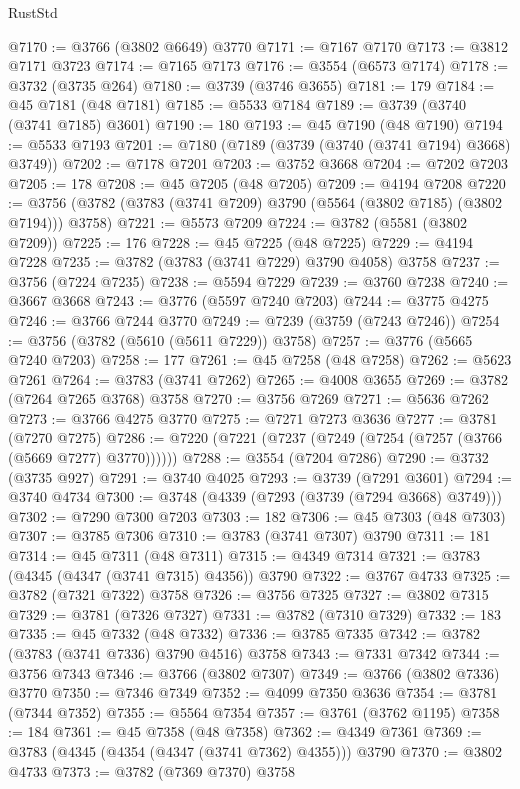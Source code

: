 \begin{lexlean}{RustStd}
\begin{coremodule}
@7170 := @3766 (@3802 @6649) @3770
@7171 := @7167 @7170
@7173 := @3812 @7171 @3723
@7174 := @7165 @7173
@7176 := @3554 (@6573 @7174)
@7178 := @3732 (@3735 @264)
@7180 := @3739 (@3746 @3655)
@7181 := 179
@7184 := @45 @7181 (@48 @7181)
@7185 := @5533 @7184
@7189 := @3739 (@3740 (@3741 @7185) @3601)
@7190 := 180
@7193 := @45 @7190 (@48 @7190)
@7194 := @5533 @7193
@7201 := @7180 (@7189 (@3739 (@3740 (@3741 @7194) @3668) @3749))
@7202 := @7178 @7201
@7203 := @3752 @3668
@7204 := @7202 @7203
@7205 := 178
@7208 := @45 @7205 (@48 @7205)
@7209 := @4194 @7208
@7220 := @3756 (@3782 (@3783 (@3741 @7209) @3790 (@5564 (@3802 @7185) (@3802 @7194))) @3758)
@7221 := @5573 @7209
@7224 := @3782 (@5581 (@3802 @7209))
@7225 := 176
@7228 := @45 @7225 (@48 @7225)
@7229 := @4194 @7228
@7235 := @3782 (@3783 (@3741 @7229) @3790 @4058) @3758
@7237 := @3756 (@7224 @7235)
@7238 := @5594 @7229
@7239 := @3760 @7238
@7240 := @3667 @3668
@7243 := @3776 (@5597 @7240 @7203)
@7244 := @3775 @4275
@7246 := @3766 @7244 @3770
@7249 := @7239 (@3759 (@7243 @7246))
@7254 := @3756 (@3782 (@5610 (@5611 @7229)) @3758)
@7257 := @3776 (@5665 @7240 @7203)
@7258 := 177
@7261 := @45 @7258 (@48 @7258)
@7262 := @5623 @7261
@7264 := @3783 (@3741 @7262)
@7265 := @4008 @3655
@7269 := @3782 (@7264 @7265 @3768) @3758
@7270 := @3756 @7269
@7271 := @5636 @7262
@7273 := @3766 @4275 @3770
@7275 := @7271 @7273 @3636
@7277 := @3781 (@7270 @7275)
@7286 := @7220 (@7221 (@7237 (@7249 (@7254 (@7257 (@3766 (@5669 @7277) @3770))))))
@7288 := @3554 (@7204 @7286)
@7290 := @3732 (@3735 @927)
@7291 := @3740 @4025
@7293 := @3739 (@7291 @3601)
@7294 := @3740 @4734
@7300 := @3748 (@4339 (@7293 (@3739 (@7294 @3668) @3749)))
@7302 := @7290 @7300 @7203
@7303 := 182
@7306 := @45 @7303 (@48 @7303)
@7307 := @3785 @7306
@7310 := @3783 (@3741 @7307) @3790
@7311 := 181
@7314 := @45 @7311 (@48 @7311)
@7315 := @4349 @7314
@7321 := @3783 (@4345 (@4347 (@3741 @7315) @4356)) @3790
@7322 := @3767 @4733
@7325 := @3782 (@7321 @7322) @3758
@7326 := @3756 @7325
@7327 := @3802 @7315
@7329 := @3781 (@7326 @7327)
@7331 := @3782 (@7310 @7329)
@7332 := 183
@7335 := @45 @7332 (@48 @7332)
@7336 := @3785 @7335
@7342 := @3782 (@3783 (@3741 @7336) @3790 @4516) @3758
@7343 := @7331 @7342
@7344 := @3756 @7343
@7346 := @3766 (@3802 @7307)
@7349 := @3766 (@3802 @7336) @3770
@7350 := @7346 @7349
@7352 := @4099 @7350 @3636
@7354 := @3781 (@7344 @7352)
@7355 := @5564 @7354
@7357 := @3761 (@3762 @1195)
@7358 := 184
@7361 := @45 @7358 (@48 @7358)
@7362 := @4349 @7361
@7369 := @3783 (@4345 (@4354 (@4347 (@3741 @7362) @4355))) @3790
@7370 := @3802 @4733
@7373 := @3782 (@7369 @7370) @3758

\end{coremodule}
\end{lexlean}
